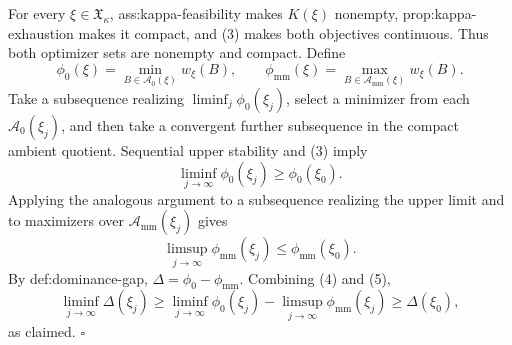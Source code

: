 For every \(\xi\in\mathfrak X_\kappa\), ass:kappa-feasibility makes \(K(\xi)\) nonempty, prop:kappa-exhaustion makes it compact, and (3) makes both objectives continuous.  Thus both optimizer sets are nonempty and compact.  Define
\[
\phi_0(\xi)=\min_{B\in\mathcal A_0(\xi)}w_\xi(B),
\qquad
\phi_{\mathrm{mm}}(\xi)=\max_{B\in\mathcal A_{\mathrm{mm}}(\xi)}w_\xi(B).
\]
Take a subsequence realizing \(\liminf_j\phi_0(\xi_j)\), select a minimizer from each \(\mathcal A_0(\xi_j)\), and then take a convergent further subsequence in the compact ambient quotient.  Sequential upper stability and (3) imply
\[
\liminf_{j\to\infty}\phi_0(\xi_j)\ge\phi_0(\xi_0).
\tag{4}
\]
Applying the analogous argument to a subsequence realizing the upper limit and to maximizers over \(\mathcal A_{\mathrm{mm}}(\xi_j)\) gives
\[
\limsup_{j\to\infty}\phi_{\mathrm{mm}}(\xi_j)
\le\phi_{\mathrm{mm}}(\xi_0).
\tag{5}
\]
By def:dominance-gap, \(\Delta=\phi_0-\phi_{\mathrm{mm}}\).  Combining (4) and (5),
\[
\liminf_{j\to\infty}\Delta(\xi_j)
\ge
\liminf_{j\to\infty}\phi_0(\xi_j)
-\limsup_{j\to\infty}\phi_{\mathrm{mm}}(\xi_j)
\ge\Delta(\xi_0),
\]
as claimed. \(\square\)